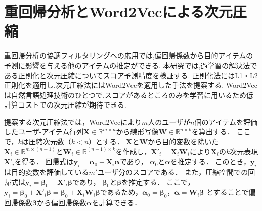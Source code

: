 \section{重回帰分析とWord2Vecによる次元圧縮}
重回帰分析の協調フィルタリングへの応用では,偏回帰係数から目的アイテムの予測に影響を与える他のアイテムの推定ができる.
本研究では,過学習の解決法である正則化と次元圧縮についてスコア予測精度を検証する.
正則化法にはL1・L2正則化を適用し,次元圧縮法にはWord2Vecを適用した手法を提案する.
Word2Vec\cite{mik}は自然言語処理技術のひとつで,スコアがあるところのみを学習に用いるため低計算コストでの次元圧縮が期待できる.

提案する次元圧縮法では，Word2Vecにより$m$人のユーザが$n$個のアイテムを評価したユーザ-アイテム行列$\boldsymbol{X} \in \mathbb{R}^{m \times n}$から線形写像$\boldsymbol{W} \in \mathbb{R}^{n \times k}$を算出する．
ここで，$k$は圧縮次元数（$k<n$）とする．
$\boldsymbol{X}$と$\boldsymbol{W}$から目的変数を除いた$\boldsymbol{X}_{i} \in \mathbb{R}^{m \times (n-1)}$と$\boldsymbol{W}_{i} \in \mathbb{R}^{(n-1) \times k}$を作成し，$\boldsymbol{X}'_{i} = \boldsymbol{X}_{i} \boldsymbol{W}_{i}$により$\boldsymbol{X}_{i}$の$k$次元表現$\boldsymbol{X}'_{i}$を得る．
回帰式は$\boldsymbol{y}_{i} =  \boldsymbol{\alpha}_{0} + \boldsymbol{X}_{i} \boldsymbol{\alpha} $であり， $\boldsymbol{\alpha}_{0}$と$\boldsymbol{\alpha}$を推定する．
このとき，$\boldsymbol{y}_{i}$は目的変数を評価している$m'$ユーザ分のスコアである．
また，圧縮空間での回帰式は$\boldsymbol{y}_{i} =  \boldsymbol{\beta}_{0} + \boldsymbol{X}'_{i} \boldsymbol{\beta} $であり， $\boldsymbol{\beta}_{0}$と$\boldsymbol{\beta}$を推定する．
ここで，$\boldsymbol{y}_{i} = \boldsymbol{\beta}_0 + \boldsymbol{X}'_{i} \boldsymbol{\beta} = \boldsymbol{\beta}_{0} + \boldsymbol{X}_{i} \boldsymbol{W}_{i} \boldsymbol{\beta}$であるため，$\boldsymbol{\alpha}_{0} = \boldsymbol{\beta}_{0}$，$\boldsymbol{\alpha} = \boldsymbol{W}_{i} \boldsymbol{\beta}$
とすることで偏回帰係数$\boldsymbol{\beta}$から偏回帰係数$\boldsymbol{\alpha}$を計算できる．
